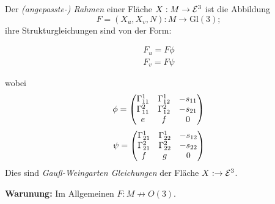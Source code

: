 \begin{lemma, definition}
	
	Der \emph{(angepasste-) Rahmen} einer Fläche $ X: M \rightarrow \mathcal E^3 $ ist die Abbildung
		\[ F = (X_u,X_v,N): M \rightarrow \mathrm{Gl}(3); \]
	ihre Strukturgleichungen sind von der Form:
		
		\begin{equation}
			\begin{split}
				F_u = F \phi \\ 
				F_v = F \psi
			\end{split}
		\end{equation}
		
	wobei 
		\[ \phi = \begin{pmatrix} \Gamma_{11}^1 & \Gamma_{12}^1 & -s_{11} \\ \Gamma_{11}^2 & \Gamma_{12}^2 & -s_{21} \\ e & f & 0 \end{pmatrix} \]
		\[ \psi = \begin{pmatrix} \Gamma_{21}^1 &\Gamma_{22}^1 & -s_{12} \\ \Gamma_{21}^2 &\Gamma_{22}^2 & -s_{22} \\ f & g & 0  \end{pmatrix} \]
	Dies sind \emph{Gauß-Weingarten Gleichungen} der Fläche $ X : \rightarrow \mathcal E^3 $.
\end{lemma, definition}

\textbf{Warunung:} Im Allgemeinen $ F: M \not \rightarrow O(3). $

